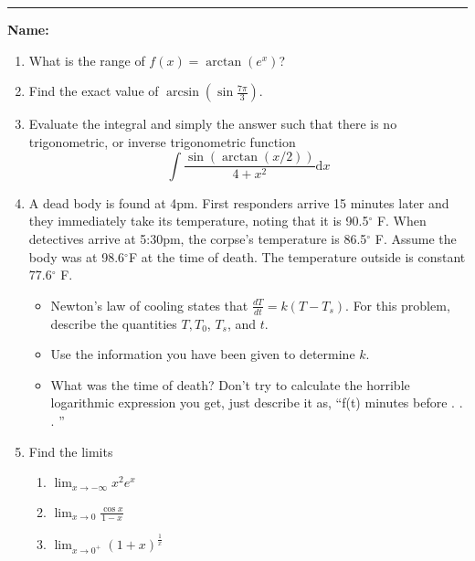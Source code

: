 \documentclass[11pt]{article}
\newcommand{\red}{\textcolor{red}}
\begin{document}
    \hrule
    \vspace{.5cm}
    \noindent\textbf{Name:} \underline{\qquad\qquad\qquad\qquad\qquad\qquad\qquad\qquad\qquad\qquad\qquad\qquad\qquad}

    \begin{enumerate}
        \item What is the range of $\displaystyle f(x) =  \arctan(e^x)$?\\[3em]
        
        \item Find the exact value of $\displaystyle \arcsin(\sin\frac{ 7\pi}{3} )$.\\[4em]
        \item  Evaluate the integral and simply the answer such that there is no trigonometric, or  inverse trigonometric function
        $$\int \frac{\sin (\arctan(x/2))}{4+x^2}\mathrm{d} x$$
        \newpage
        \item A dead body is found at 4pm. 
        First responders arrive 15 minutes later and they immediately take its temperature, noting that it is 90.5$^\circ$ F.
        When detectives arrive at 5:30pm, the corpse's temperature is 86.5$^\circ$ F. Assume the body was at 98.6$^\circ $F at the time of death.
        The temperature outside is constant 77.6$^\circ$ F. \\
        \begin{itemize}
            \item Newton's law of cooling states that $\frac{dT}{dt} = k(T-T_s)$. 
            For this problem, describe the quantities $T,T_{0}$, $T_{s}$, and $t$.\\[5em]
            \item Use the information you have been given to determine $k$.\\[7em]
            \item What was the time of death? Don't try to calculate the horrible logarithmic expression you get, just describe it as, ``f(t) minutes before . . . ''\\[8em]
        \end{itemize}
        \newpage
        \item Find the limits\\
        \begin{enumerate}
            \item  $\displaystyle \lim_{x\to -\infty} x^2 e^x$\vfill
            \item  $\displaystyle \lim_{x\to 0} \frac{\cos x}{1-x}$\vfill
            \item $\displaystyle \lim_{x\to0^{+}}(1+x)^{\frac{1}{x}}$\vfill
        \end{enumerate}
    \end{enumerate}    
\end{document}
